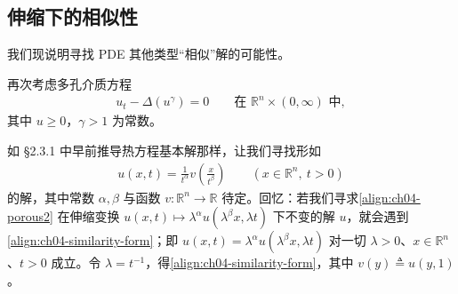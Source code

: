 \documentclass[../../main.tex]{subfiles}
\begin{document}
\subsection{伸缩下的相似性}\label{subsection:ch04-scaling}

我们现说明寻找 PDE 其他类型``相似''解的可能性。

\begin{example}[一个伸缩不变解]\label{example:ch04-barenblatt}再次考虑多孔介质方程
\begin{align}\label{align:ch04-porous2}
u_t-\Delta(u^\gamma)=0 \qquad\text{在 }\mathbb{R}^n\times(0,\infty)\text{ 中},
\end{align}
其中 $u\geqslant 0$，$\gamma>1$ 为常数。

如 \S2.3.1 中早前推导热方程基本解那样，让我们寻找形如
\begin{align}\label{align:ch04-similarity-form}
u(x,t)=\frac{1}{t^\alpha}v\!\left(\frac{x}{t^\beta}\right) \qquad(x\in\mathbb{R}^n,\ t>0)
\end{align}
的解，其中常数 $\alpha,\beta$ 与函数 $v:\mathbb{R}^n\to\mathbb{R}$ 待定。回忆：若我们寻求\eqref{align:ch04-porous2} 在伸缩变换 $u(x,t)\mapsto\lambda^\alpha u(\lambda^\beta x,\lambda t)$ 下不变的解 $u$，就会遇到\eqref{align:ch04-similarity-form}；即 $u(x,t)=\lambda^\alpha u(\lambda^\beta x,\lambda t)$ 对一切 $\lambda>0$、$x\in\mathbb{R}^n$、$t>0$ 成立。令 $\lambda=t^{-1}$，得\eqref{align:ch04-similarity-form}，其中 $v(y)\triangleq u(y,1)$。


\end{example}
\end{document}
